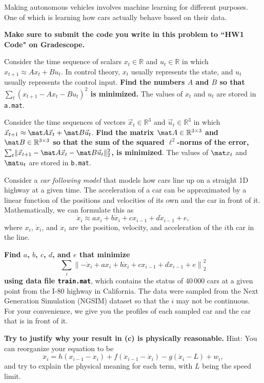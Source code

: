 \documentclass[preview]{standalone}
\begin{document}

Making autonomous vehicles involves machine learning for different purposes. One of which is
learning how cars actually behave based on their data.

\textbf{Make sure to submit the code you write in this problem to ``HW1 Code" on Gradescope.}

\begin{Parts}

\Part Consider the time sequence of scalars $x_t \in \mathbb{R}$ and $u_t \in \mathbb{R}$ in which
$x_{t+1} \approx A  x_{t} + B u_{t}$.  In control theory, $x_t$ usually represents the state, and
$u_t$ usually represents the control input.  \textbf{Find the numbers $A$ and $B$ so that
$\sum_t(x_{t+1} - A  x_{t} - B u_{t})^2$ is minimized.} The values of $x_t$ and $u_t$ are stored in
\texttt{a.mat}.




\Part Consider the time sequences of vectors
$\vec x_t \in \mathbb{R}^3$ and $\vec u_t \in \mathbb{R}^3$ in which
$\vec x_{t+1} \approx \mat A \vec x_{t} + \mat B \vec
u_{t}$. \textbf{Find the matrix $\mat A \in \mathbb{R}^{3\times 3}$
  and $\mat B \in \mathbb{R}^{3\times 3}$ so that the sum of the squared
  $\ell^2$-norms of the error,
  $\sum_t\lVert\vec x_{t+1} - \mat A \vec x_{t} - \mat B \vec
  u_{t}\lVert_2^2$, is minimized}.  The values of $\mat x_t$ and
$\mat u_t$ are stored in \texttt{b.mat}.




\Part Consider a \textit{car following model} that models how cars line up on a straight 1D highway
at a given time.  The acceleration of a car can be approximated by a linear function of the
positions and velocities of its own and the car in front of it.  Mathematically, we can formulate
this as $$ \ddot{x}_i \approx a x_{i} + b \dot{x}_{i} + c x_{i-1} + d \dot{x}_{i-1} + e,$$ where
$x_i$, $\dot x_i$, and $\ddot x_i$ are the position, velocity, and acceleration of the $i$th
car in the line.

\textbf{Find $a$, $b$, $c$, $d$, and $e$ that minimize
\[
\sum_i \left\lVert -\ddot{x}_i + a x_{i} + b \dot{x}_{i} + c x_{i-1} + d \dot{x}_{i-1} + e\right\lVert_2^2
\]
using data file \texttt{train.mat}}, which contains the status of 40\,000 cars at a given point
from the I-80 highway in California. The data were sampled from the Next Generation Simulation
(NGSIM) dataset so that the $i$ may not be continuous.  For your convenience, we give you the
profiles of each sampled car and the car that is in front of it.




\Part \textbf{Try to justify why your result in (c) is physically reasonable.}  Hint:  You can
reorganize your equation to be
\[
\ddot{x}_i = h (x_{i-1}- x_{i}) + f (\dot{x}_{i-1} - \dot{x}_{i}) - g (\dot{x}_{i}-L)+ w_i,
\]
and try to explain the physical meaning for each term, with $L$ being the speed limit.




\end{Parts}
\end{document}

